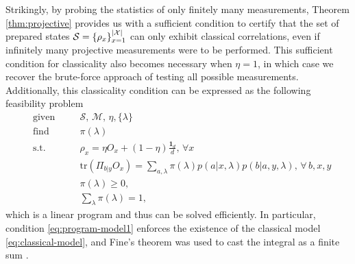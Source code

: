 \documentclass[a4paper,preprintnumbers,floatfix,superscriptaddress,pra,twocolumn,showpacs,notitlepage,longbibliography]{revtex4-2}
\begin{document}
    Strikingly, by probing the statistics of only finitely many measurements, Theorem \ref{thm:projective} provides us with a sufficient condition to certify that the set of prepared states $\mathcal{S} = \{ \rho_x \}_{x=1}^{\abs{\mathcal{X}}}$ can only exhibit classical correlations, even if infinitely many projective measurements were to be performed. This sufficient condition for classicality also becomes necessary when $\eta=1$, in which case we recover the brute-force approach of testing all possible measurements. Additionally, this classicality condition can be expressed as the following feasibility problem
    \begin{subequations}
		\begin{alignat}{2}
			&\text{given}    &\quad & \mathcal{S},\, \mathcal{M},\, \eta, \{ \lambda \} \\
	        &\text{find}   &	  & \pi(\lambda) \\
			&\text{s.t.}    &      & \rho_x = \eta O_x + \left( 1 - \eta \right) \frac{\bm{1}_d}{d}, \,\forall x \\
			&                  &      & \text{tr}(\Pi_{b \vert y} O_x) = \sum_{a, \lambda} \pi(\lambda) p(a \vert x, \lambda) p(b \vert a, y, \lambda), \,\forall\, b, x, y \label{eq:program-model1}\\
			&				   &	  & \pi(\lambda) \geq 0, \\
			&				   &	  & \sum_\lambda \pi(\lambda) = 1,
		\end{alignat}
		\label{eq:factibility}
	\end{subequations}
    which is a linear program and thus can be solved efficiently. In particular, condition \eqref{eq:program-model1} enforces the existence of the classical model \eqref{eq:classical-model}, and Fine's theorem was used to cast the integral as a finite sum \cite{fine-hidden-1982}.
    
\end{document}
